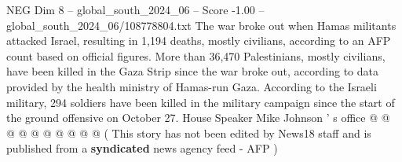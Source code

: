 \begin{textsample}{NEG Dim 8 – global\_south\_2024\_06 – Score -1.00 – global\_south\_2024\_06/108778804.txt}
The war broke out when Hamas militants attacked Israel, resulting in 1,194 deaths, mostly civilians, according to an AFP count based on official figures.
More than 36,470 Palestinians, mostly civilians, have been killed in the Gaza Strip since the war broke out, according to data provided by the health ministry of Hamas-run Gaza.
According to the Israeli military, 294 soldiers have been killed in the military campaign since the start of the ground offensive on October 27.
House Speaker Mike Johnson ' s office @ @ @ @ @ @ @ @ @ @ ( This story has not been edited by News18 staff and is published from a \textbf{syndicated} news agency feed - AFP )

\end{textsample}
